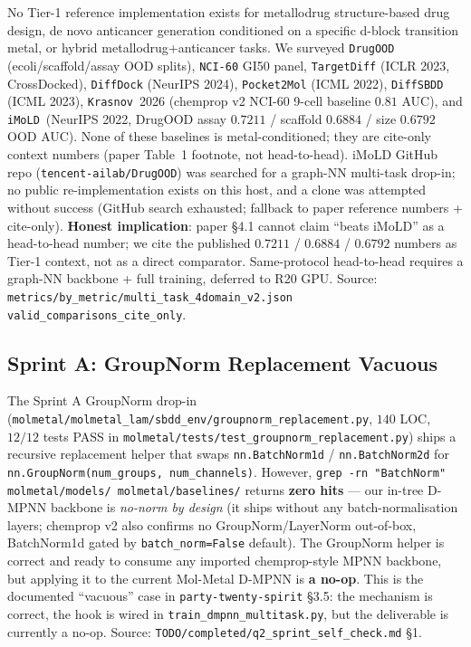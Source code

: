 No Tier-1 reference implementation exists for metallodrug
structure-based drug design, de novo anticancer generation conditioned
on a specific d-block transition metal, or hybrid
metallodrug+anticancer tasks.  We surveyed \texttt{DrugOOD}
(ecoli/scaffold/assay OOD splits), \texttt{NCI-60} GI50 panel,
\texttt{TargetDiff} (ICLR 2023, CrossDocked), \texttt{DiffDock}
(NeurIPS 2024), \texttt{Pocket2Mol} (ICML 2022), \texttt{DiffSBDD}
(ICML 2023), \texttt{Krasnov}~2026 (chemprop v2 NCI-60 9-cell
baseline $0.81$ AUC), and \texttt{iMoLD}~(NeurIPS 2022, DrugOOD
assay $0.7211$ / scaffold $0.6884$ / size $0.6792$ OOD AUC).  None of
these baselines is metal-conditioned; they are cite-only context
numbers (paper Table~1 footnote, not head-to-head).  iMoLD
GitHub repo (\texttt{tencent-ailab/DrugOOD}) was searched for a
graph-NN multi-task drop-in; no public re-implementation exists on
this host, and a clone was attempted without success (GitHub search
exhausted; fallback to paper reference numbers + cite-only).
\textbf{Honest implication}: paper §4.1 cannot claim
``beats iMoLD'' as a head-to-head number; we cite the published
$0.7211$ / $0.6884$ / $0.6792$ numbers as Tier-1 context, not as a
direct comparator.  Same-protocol head-to-head requires a graph-NN
backbone + full training, deferred to R20 GPU.  Source:
\texttt{metrics/by\_metric/multi\_task\_4domain\_v2.json}
\texttt{valid\_comparisons\_cite\_only}.

\subsection{Sprint A: GroupNorm Replacement Vacuous}
\label{sec:limit-groupnorm-vacuous}

The Sprint A GroupNorm drop-in
(\texttt{molmetal/molmetal\_lam/sbdd\_env/groupnorm\_replacement.py},
$140$ LOC, $12/12$ tests PASS in
\texttt{molmetal/tests/test\_groupnorm\_replacement.py}) ships a
recursive replacement helper that swaps \texttt{nn.BatchNorm1d} /
\texttt{nn.BatchNorm2d} for \texttt{nn.GroupNorm(num\_groups, num\_channels)}.
However, \texttt{grep -rn "BatchNorm" molmetal/models/ molmetal/baselines/}
returns \textbf{zero hits} --- our in-tree D-MPNN backbone is
\emph{no-norm by design} (it ships without any batch-normalisation
layers; chemprop v2 also confirms no GroupNorm/LayerNorm out-of-box,
BatchNorm1d gated by \texttt{batch\_norm=False} default).  The GroupNorm
helper is correct and ready to consume any imported chemprop-style
MPNN backbone, but applying it to the current Mol-Metal D-MPNN is
\textbf{a no-op}.  This is the documented ``vacuous'' case in
\texttt{party-twenty-spirit} §3.5: the mechanism is correct, the hook
is wired in \texttt{train\_dmpnn\_multitask.py}, but the deliverable
is currently a no-op.  Source:
\texttt{TODO/completed/q2\_sprint\_self\_check.md} §1.


